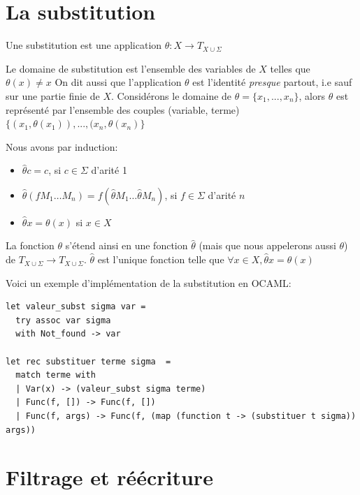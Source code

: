 \documentclass[11pt]{book}
\begin{document}
\section{La substitution}
Une substitution est une application $\theta : X \rightarrow T_{X \cup \Sigma} $

Le domaine de substitution est l'ensemble des variables de $X$ telles que $\theta (x) \neq x$
On dit aussi que l'application $\theta$ est l'identité \textit{presque} partout, i.e sauf sur une partie finie
de $X$.
Considérons le domaine de $\theta = \{x_1, ..., x_n\}$, alors $\theta$ est représenté par l'ensemble
des couples (variable, terme) $\{(x_1, \theta (x_1)), ...,(x_n, \theta (x_n) \} $

Nous avons par induction:
\begin{itemize}
	\item $\hat{\theta} c = c$, si $c \in \Sigma$ d'arité 1
	\item $\hat{\theta} (f M_1 \dots M_n) = f(\hat{\theta} M_1 \dots \hat{\theta} M_n )$, si $f \in \Sigma$ d'arité $n$ 
	\item $\hat{\theta} x = \theta (x)$ si $x \in X$
\end{itemize}
La fonction  $\theta$ s'étend ainsi en une fonction $\hat{\theta}$ (mais que nous appelerons aussi $\theta$)
 de  $T_{X \cup \Sigma} \rightarrow T_{X \cup \Sigma} $.
$\hat{\theta}$ est l'unique fonction telle que $\forall x \in X, \hat{\theta}x = \theta (x)$
\begin{center}
\end{center}

Voici un exemple d'implémentation de la substitution en OCAML:
\begin{Verbatim}
let valeur_subst sigma var =
  try assoc var sigma
  with Not_found -> var

let rec substituer terme sigma  =
  match terme with
  | Var(x) -> (valeur_subst sigma terme)
  | Func(f, []) -> Func(f, []) 
  | Func(f, args) -> Func(f, (map (function t -> (substituer t sigma)) args))
\end{Verbatim}

\section{Filtrage et réécriture}
\end{document}
